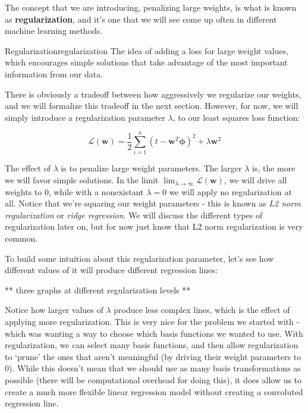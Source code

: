 The concept that we are introducing, penalizing large weights, is what is known as \textbf{regularization}, and it's one that we will see come up often in different machine learning methods.

\begin{definition}{Regularization}{regularization}
    The idea of adding a loss for large weight values, which encourages simple solutions that take advantage of the most important information from our data.
\end{definition}

There is obviously a tradeoff between how aggressively we regularize our weights, and we will formalize this tradeoff in the next section. However, for now, we will simply introduce a regularization parameter $\lambda$, to our least squares loss function:

\begin{equation} \label{least-squares-loss-fn-w-regularization}
    \mathcal{L}(\textbf{w}) = \frac{1}{2} \sum_{i=1}^{n} (t - \textbf{w}^{T}\boldsymbol{\phi})^2 + \lambda\textbf{w}^{2}
\end{equation}

The effect of $\lambda$ is to penalize large weight parameters. The larger $\lambda$ is, the more we will favor simple solutions. In the limit $\lim_{\lambda\to\infty} \mathcal{L}(\textbf{w})$, we will drive all weights to 0, while with a nonexistant $\lambda = 0$ we will apply no regularization at all. Notice that we're squaring our weight parameters - this is known as \textit{L2 norm regularization} or \textit{ridge regression}. We will discuss the different types of regularization later on, but for now just know that L2 norm regularization is very common.

To build some intuition about this regularization parameter, let's see how different values of it will produce different regression lines:

** three graphs at different regularization levels **

Notice how larger values of $\lambda$ produce less complex lines, which is the effect of applying more regularization. This is very nice for the problem we started with - which was wanting a way to choose which basis functions we wanted to use. With regularization, we can select many basis functions, and then allow regularization to `prune' the ones that aren't meaningful (by driving their weight parameters to 0). While this doesn't mean that we should use as many basis transformations as possible (there will be computational overhead for doing this), it does allow us to create a much more flexible linear regression model without creating a convoluted regression line.

